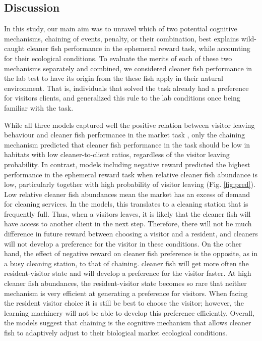 \documentclass[]{rsos}%
\begin{document}
\hypertarget{discussion}{%
\subsection{Discussion}\label{discussion}}

In this study, our main aim was to unravel which of two potential
cognitive mechanisms, chaining of events, penalty,
or their combination, best explains wild-caught cleaner fish
performance in the ephemeral reward task, while accounting for their
ecological conditions. To evaluate the merits of each of these two mechanisms
separately and combined, we considered cleaner fish performance
in the lab test to have its origin from the these fish apply
in their natural environment. That is, individuals that
solved the task already had a preference for
visitors clients, and generalized this rule to the lab conditions
once being familiar with the task.

While all three models captured well the positive relation between visitor
leaving behaviour and cleaner fish performance in
the market task \citep{triki_Biological_2019}, only the chaining mechanism
predicted that cleaner fish performance in the task should be low in
habitats with low cleaner-to-client ratios, regardless of the
visitor leaving probability. In contrast, models including
negative reward predicted the highest performance in the ephemeral
reward task when relative cleaner fish abundance is low, particularly
together with high probability of visitor leaving (Fig. \ref{fig:pred}).
Low relative cleaner fish abundances mean the market has an excess of demand for
cleaning services. In the models, this translates to a cleaning station
that is frequently full. Thus, when a visitors leaves, it is likely that the
cleaner fish will have access to another client in the next step. Therefore,
there will not be much difference in future reward between choosing
a visitor and a resident, and cleaners will not develop a preference for the
visitor in these conditions. On the other hand, the effect of negative reward
on cleaner fish preference is the opposite, as in a busy cleaning station, to
that of chaining. cleaner fish will get more often the resident-visitor
state and will develop a preference for the visitor faster.
At high cleaner fish abundances, the resident-visitor state
becomes so rare that neither mechanism is very efficient
at generating a preference for visitors. When facing the resident
visitor choice it is still be best to choose the visitor; however,
the learning machinery will not be able to develop this preference
efficiently. Overall, the models suggest that chaining is the cognitive
mechanism that allows cleaner fish to adaptively adjust to their
biological market ecological conditions.
\end{document}
